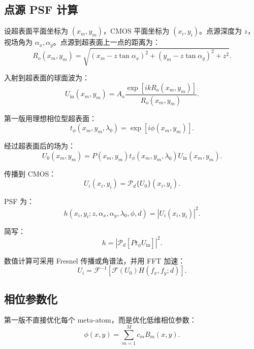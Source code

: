 \documentclass[11pt,a4paper,fontset=none]{ctexart}
\begin{document}
\subsection{点源 PSF 计算}

设超表面平面坐标为 $(x_m,y_m)$，CMOS 平面坐标为 $(x_i,y_i)$。点源深度为 $z$，视场角为 $\alpha_x,\alpha_y$。点源到超表面上一点的距离为：
\begin{equation}
  R_o(x_m,y_m)
  =
  \sqrt{
  (x_m-z\tan\alpha_x)^2+
  (y_m-z\tan\alpha_y)^2+
  z^2
  }.
\end{equation}

入射到超表面的球面波为：
\begin{equation}
  U_{\mathrm{in}}(x_m,y_m)
  =
  A_o
  \frac{\exp[i k R_o(x_m,y_m)]}{R_o(x_m,y_m)}.
\end{equation}

第一版用理想相位型超表面：
\begin{equation}
  t_\phi(x_m,y_m,\lambda_0)=\exp[i\phi(x_m,y_m)].
\end{equation}

经过超表面后的场为：
\begin{equation}
  U_0(x_m,y_m)
  =
  P(x_m,y_m)t_\phi(x_m,y_m,\lambda_0)U_{\mathrm{in}}(x_m,y_m).
\end{equation}

传播到 CMOS：
\begin{equation}
  U_i(x_i,y_i)
  =
  \mathcal P_d\{U_0\}(x_i,y_i).
\end{equation}

PSF 为：
\begin{equation}
  h(x_i,y_i;z,\alpha_x,\alpha_y,\lambda_0,\phi,d)
  =
  |U_i(x_i,y_i)|^2.
\end{equation}

简写：
\begin{equation}
\boxed{
  h=
  \left|
  \mathcal P_d
  \left[
  P t_\phi U_{\mathrm{in}}
  \right]
  \right|^2.
}
\end{equation}

数值计算可采用 Fresnel 传播或角谱法，并用 FFT 加速：
\begin{equation}
  U_i
  =
  \mathcal F^{-1}
  \left[
  \mathcal F(U_0)
  H(f_x,f_y;d)
  \right].
\end{equation}

\subsection{相位参数化}

第一版不直接优化每个 meta-atom，而是优化低维相位参数：
\begin{equation}
  \phi(x,y)=\sum_{m=1}^{M}c_mB_m(x,y).
\end{equation}
\end{document}
